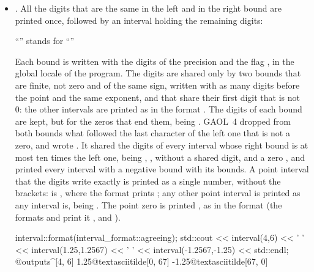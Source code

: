 \begin{itemize}
\item[$\bullet$] . All the digits that are the same in
the left and in the right bound are printed once, followed by an interval
holding the remaining digits:
\begin{center}
``\element{3.141\textasciitilde[5926, 6001]}'' stands for
``''
\end{center}
Each bound is written with the digits of the precision and the flag
, in the global locale of the program. The digits are
shared only by two bounds that are finite, not zero and of the same sign,
written with as many digits before the point and the same exponent, and
that share their first digit that is not 0: the other intervals are printed
as in the format . The digits of each bound are
kept, but for the zeros that end them,  being
\code{1.25\textasciitilde[0, 67]}.\newinvfive{} GAOL~4 dropped from both bounds what followed the last
character of the left one that is not a zero, and wrote 
\code{1.25\textasciitilde[, ]}. It shared the digits of every interval
whose right bound is at most ten times the left one,  being
\code{1\textasciitilde[., 0.]},  \code{\textasciitilde[4., 6.]},
without a shared digit, and a zero \code{\textasciitilde[-0., 0.]}, and
printed every interval with a negative bound with its bounds. A point
interval that the digits write exactly is printed as a single number,
without the brackets:  is ,
where the format  prints \code{[4]}; any other point
interval is printed as any interval is,  being
\code{0.100000000000000\textasciitilde[0, 1]}. The point zero is printed
\code{[0]}, as in the format  (the formats 
and  print it , and 
\code{[0x0p+0]}).
\begin{example}
interval::format(interval_format::agreeing);
std::cout << interval(4,6) << ' ' << interval(1.25,1.2567) << ' '
          << interval(-1.2567,-1.25) << std::endl;
@outputs^[4, 6] 1.25@textasciitilde[0, 67] -1.25@textasciitilde[67, 0]~
\end{example}


\end{itemize}
